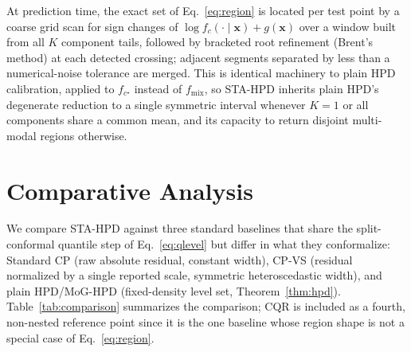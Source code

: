 \documentclass[10pt,twocolumn,a4paper]{article}
\begin{document}
At prediction time, the exact set of Eq.~\eqref{eq:region} is located per test point by a coarse
grid scan for sign changes of $\log f_c(\cdot\mid\bm x) + g(\bm x)$ over a window built from all $K$
component tails, followed by bracketed root refinement (Brent's method) at each detected crossing;
adjacent segments separated by less than a numerical-noise tolerance are merged. This is identical
machinery to plain HPD calibration, applied to $f_{c^\star}$ instead of $f_{\mathrm{mix}}$, so
STA-HPD inherits plain HPD's degenerate reduction to a single symmetric interval whenever $K=1$ or
all components share a common mean, and its capacity to return disjoint multi-modal regions
otherwise.

\section{Comparative Analysis}
\label{sec:comparison}
We compare STA-HPD against three standard baselines that share the split-conformal quantile step of
Eq.~\eqref{eq:qlevel} but differ in what they conformalize: Standard CP (raw absolute residual,
constant width), CP-VS (residual normalized by a single reported scale, symmetric heteroscedastic
width), and plain HPD/MoG-HPD (fixed-density level set, Theorem~\ref{thm:hpd}). Table~\ref{tab:comparison}
summarizes the comparison; CQR is included as a fourth, non-nested reference point since it is the
one baseline whose region shape is not a special case of Eq.~\eqref{eq:region}.
\end{document}
